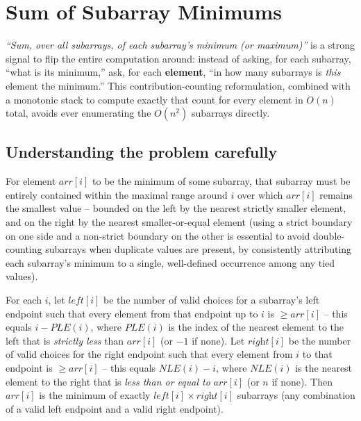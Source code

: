 \section{Sum of Subarray Minimums}
\label{sec:sq-sum-subarray-minimums}


\begin{patternbox}
\emph{``Sum, over all subarrays, of each subarray's minimum (or
maximum)''} is a strong signal to flip the entire computation around:
instead of asking, for each subarray, ``what is its minimum,'' ask, for
each \textbf{element}, ``in how many subarrays is \emph{this} element the
minimum.'' This contribution-counting reformulation, combined with a
monotonic stack to compute exactly that count for every element in
$O(n)$ total, avoids ever enumerating the $O(n^2)$ subarrays directly.
\end{patternbox}

\subsection*{Understanding the problem carefully}

For element $\textit{arr}[i]$ to be the minimum of some subarray, that
subarray must be entirely contained within the maximal range around $i$
over which $\textit{arr}[i]$ remains the smallest value -- bounded on the
left by the nearest strictly smaller element, and on the right by the
nearest smaller-or-equal element (using a strict boundary on one side and
a non-strict boundary on the other is essential to avoid double-counting
subarrays when duplicate values are present, by consistently attributing
each subarray's minimum to a single, well-defined occurrence among any
tied values).

\begin{ideabox}
For each $i$, let $\textit{left}[i]$ be the number of valid choices for a
subarray's left endpoint such that every element from that endpoint up to
$i$ is $\ge \textit{arr}[i]$ -- this equals $i - \textit{PLE}(i)$, where
$\textit{PLE}(i)$ is the index of the nearest element to the left that is
\emph{strictly less} than $\textit{arr}[i]$ (or $-1$ if none). Let
$\textit{right}[i]$ be the number of valid choices for the right endpoint
such that every element from $i$ to that endpoint is $\ge
\textit{arr}[i]$ -- this equals $\textit{NLE}(i) - i$, where
$\textit{NLE}(i)$ is the nearest element to the right that is \emph{less
than or equal to} $\textit{arr}[i]$ (or $n$ if none). Then
$\textit{arr}[i]$ is the minimum of exactly $\textit{left}[i] \times
\textit{right}[i]$ subarrays (any combination of a valid left endpoint and
a valid right endpoint).
\end{ideabox}

